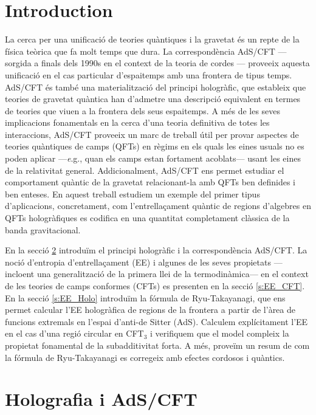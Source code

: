 \documentclass[twocolumn]{revtex4}
\begin{document}
\section{Introduction} \label{s:Intro}
La cerca per una unificació de teories quàntiques i la gravetat és un repte de la física teòrica que fa molt temps que dura. La correspondència AdS/CFT ---sorgida a finals dels 1990s en el context de la teoria de cordes \cite{maldacena_large_1999}--- proveeix aquesta unificació en el cas particular d'espaitemps amb una frontera de tipus temps. AdS/CFT és també una materialització del principi hologràfic, que estableix que teories de gravetat quàntica han d'admetre una descripció equivalent en termes de teories que viuen a la frontera dels seus espaitemps.
A més de les seves implicacions fonamentals en la cerca d'una teoria definitiva de totes les interaccions, AdS/CFT proveeix un marc de treball útil per provar aspectes de teories quàntiques de camps (QFTs) en règims en els quals les eines usuals no es poden aplicar ---{\emph e.g.,} quan els camps estan fortament acoblats--- usant les eines de la relativitat general.
Addicionalment, AdS/CFT ens permet estudiar el comportament quàntic de la gravetat relacionant-la amb QFTs ben definides i ben enteses.
En aquest treball estudiem un exemple del primer tipus d'aplicacions, concretament, com l'entrellaçament quàntic de regions d'algebres en QFTs hologràfiques es codifica en una quantitat completament clàssica de la banda gravitacional.

En la secció \ref{s:Holo_AdS/CFT} introduïm el principi hologràfic i la correspondència AdS/CFT. La noció d'entropia d'entrellaçament (EE) i algunes de les seves propietats ---incloent una generalització de la primera llei de la termodinàmica--- en el context de les teories de camps conformes (CFTs) es presenten en la secció \ref{s:EE_CFT}. En la secció \ref{s:EE_Holo} introduïm la fórmula de Ryu-Takayanagi, que ens permet calcular l'EE hologràfica de regions de la frontera a partir de l'àrea de funcions extremals en l'espai d'anti-de Sitter (AdS). Calculem explícitament l'EE en el cas d'una regió circular en CFT$_3$ i verifiquem que el model compleix la propietat fonamental de la subadditivitat forta. A més, proveïm un resum de com la fórmula de Ryu-Takayanagi es corregeix amb efectes cordosos i quàntics.


\section{Holografia i AdS/CFT} \label{s:Holo_AdS/CFT}
\end{document}
